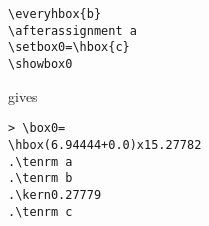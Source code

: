 \documentclass{book}
\begin{document}
\begin{example} \label{every:box:assign}
\begin{verbatim}
\everyhbox{b}
\afterassignment a
\setbox0=\hbox{c}
\showbox0
\end{verbatim}
gives
\begin{verbatim}
> \box0=
\hbox(6.94444+0.0)x15.27782
.\tenrm a
.\tenrm b
.\kern0.27779
.\tenrm c
\end{verbatim}
\end{example}
\end{document}
